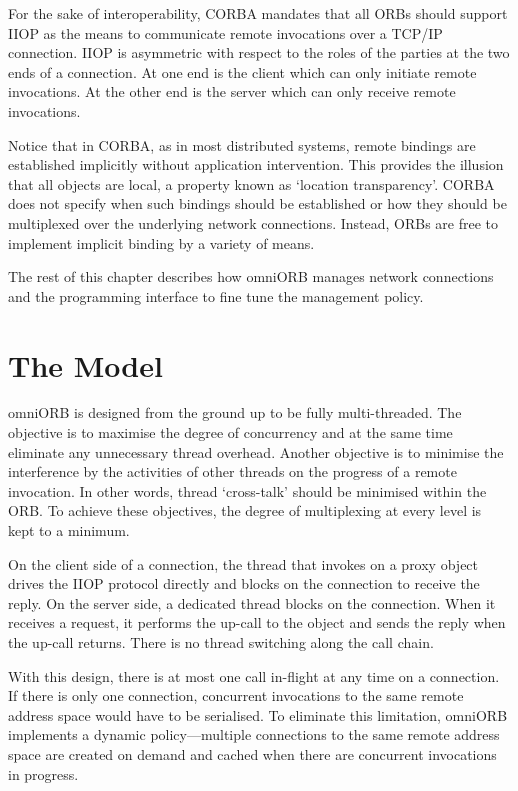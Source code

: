\documentclass[11pt,twoside,a4paper]{book}
\begin{document}
For the sake of interoperability, CORBA mandates that all ORBs should
support IIOP as the means to communicate remote invocations over a
TCP/IP connection. IIOP is asymmetric with respect to the roles of the
parties at the two ends of a connection. At one end is the client
which can only initiate remote invocations. At the other end is the
server which can only receive remote invocations.

Notice that in CORBA, as in most distributed systems, remote bindings
are established implicitly without application intervention. This
provides the illusion that all objects are local, a property known as
`location transparency'. CORBA does not specify when such bindings
should be established or how they should be multiplexed over the
underlying network connections. Instead, ORBs are free to implement
implicit binding by a variety of means.

The rest of this chapter describes how omniORB manages network
connections and the programming interface to fine tune the management
policy.

\section{The Model}

omniORB is designed from the ground up to be fully multi-threaded. The
objective is to maximise the degree of concurrency and at the same
time eliminate any unnecessary thread overhead. Another objective is
to minimise the interference by the activities of other threads on the
progress of a remote invocation. In other words, thread `cross-talk'
should be minimised within the ORB. To achieve these objectives, the
degree of multiplexing at every level is kept to a minimum.

On the client side of a connection, the thread that invokes on a proxy
object drives the IIOP protocol directly and blocks on the connection
to receive the reply. On the server side, a dedicated thread blocks on
the connection. When it receives a request, it performs the up-call to
the object and sends the reply when the up-call returns. There is no
thread switching along the call chain.

With this design, there is at most one call in-flight at any time on a
connection. If there is only one connection, concurrent invocations to
the same remote address space would have to be serialised. To
eliminate this limitation, omniORB implements a dynamic
policy---multiple connections to the same remote address space are
created on demand and cached when there are concurrent invocations in
progress.
\end{document}
